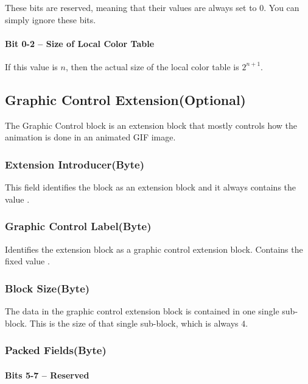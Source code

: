 These bits are reserved, meaning that their values are always set to
$0$. You can simply ignore these bits.

\paragraph{Bit 0-2 -- Size of Local Color Table}

If this value is $n$, then the actual size of the local color table is
$2^{n + 1}$.

\subsection{Graphic Control Extension(Optional)}

The Graphic Control block is an extension block that mostly controls
how the animation is done in an animated GIF image.

\subsubsection{Extension Introducer(Byte)}

This field identifies the block as an extension block and it always
contains the value .

\subsubsection{Graphic Control Label(Byte)}

Identifies the extension block as a graphic control extension
block. Contains the fixed value .

\subsubsection{Block Size(Byte)}

The data in the graphic control extension block is contained in one
single sub-block. This is the size of that single sub-block, which is
always $4$.

\subsubsection{Packed Fields(Byte)}

\paragraph{Bits 5-7 -- Reserved}

